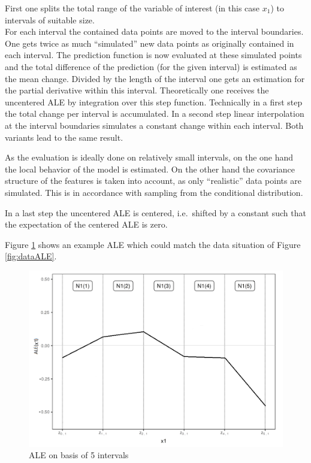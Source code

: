 \documentclass[]{krantz}
\begin{document}
First one splits the total range of the variable of interest (in this
case \(x_1\)) to intervals of suitable size.\\
For each interval the contained data points are moved to the interval
boundaries. One gets twice as much ``simulated'' new data points as
originally contained in each interval. The prediction function is now
evaluated at these simulated points and the total difference of the
prediction (for the given interval) is estimated as the mean change.
Divided by the length of the interval one gets an estimation for the
partial derivative within this interval. Theoretically one receives the
uncentered ALE by integration over this step function. Technically in a
first step the total change per interval is accumulated. In a second
step linear interpolation at the interval boundaries simulates a
constant change within each interval. Both variants lead to the same
result.

As the evaluation is ideally done on relatively small intervals, on the
one hand the local behavior of the model is estimated. On the other hand
the covariance structure of the features is taken into account, as only
``realistic'' data points are simulated. This is in accordance with
sampling from the conditional distribution.

In a last step the uncentered ALE is centered, i.e.~shifted by a
constant such that the expectation of the centered ALE is zero.

Figure \ref{fig:aleEx} shows an example ALE which could match the data
situation of Figure \ref{fig:dataALE}.

\begin{figure}
\includegraphics[width=1\linewidth]{images/ale_example} \caption{ALE on basis of 5 intervals}\label{fig:aleEx}
\end{figure}
\end{document}
